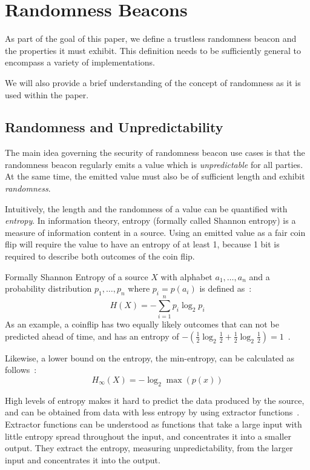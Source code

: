 \section{Randomness Beacons}\label{sec:beacons}

As part of the goal of this paper, we define a trustless randomness beacon and the properties it must exhibit.
This definition needs to be sufficiently general to encompass a variety of implementations.

We will also provide a brief understanding of the concept of randomness as it is used within the paper.

\subsection{Randomness and Unpredictability}\label{sub:beacons_randomness}
The main idea governing the security of randomness beacon use cases is that the randomness beacon regularly emits a value which is \emph{unpredictable} for all parties.
At the same time, the emitted value must also be of sufficient length and exhibit \emph{randomness}.

Intuitively, the length and the randomness of a value can be quantified with \emph{entropy}.
In information theory, entropy (formally called Shannon entropy) is a measure of information content in a source.
Using an emitted value as a fair coin flip will require the value to have an entropy of at least 1, because 1 bit is required to describe both outcomes of the coin flip.

Formally Shannon Entropy of a source $X$ with alphabet ${a_1, \ldots, a_n}$ and a probability distribution ${p_1, \ldots , p_n}$ where $p_i = p(a_i)$ is defined as~\cite{informationtheory}:
$$
H(X) = -\sum\limits_{i = 1}^n p_{i}\log_{2} p_{i}
$$
As an example, a coinflip has two equally likely outcomes that can not be predicted ahead of time, and has an entropy of $-(\frac{1}{2}\log_2 \frac{1}{2} + \frac{1}{2}\log_2 \frac{1}{2}) = 1$~\cite{informationtheory}.

Likewise, a lower bound on the entropy, the min-entropy, can be calculated as follows~\cite{informationtheory}:
$$
H_\infty(X) = -\log_{2}\max(p(x))
$$

High levels of entropy makes it hard to predict the data produced by the source, and can be obtained from data with less entropy by using extractor functions~\cite{pseudorandomness}.
Extractor functions can be understood as functions that take a large input with little entropy spread throughout the input, and concentrates it into a smaller output.
They extract the entropy, measuring unpredictability, from the larger input and concentrates it into the output.


